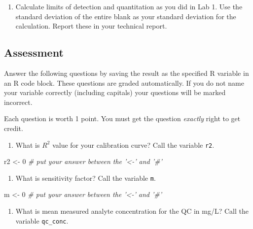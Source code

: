 \documentclass[]{tufte-book}
\newenvironment{Shaded}{}{}
\newcommand{\CommentTok}[1]{\textcolor[rgb]{0.38,0.63,0.69}{\textit{#1}}}
\newcommand{\DecValTok}[1]{\textcolor[rgb]{0.25,0.63,0.44}{#1}}
\newcommand{\NormalTok}[1]{#1}
\newcommand{\StringTok}[1]{\textcolor[rgb]{0.25,0.44,0.63}{#1}}
\providecommand{\tightlist}{%
  \setlength{\itemsep}{0pt}\setlength{\parskip}{0pt}}
\begin{document}
\begin{enumerate}
\def\labelenumi{\arabic{enumi}.}
\tightlist
\item
  Calculate limits of detection and quantitation as you did in Lab 1. Use the standard deviation of the entire blank as your standard deviation for the calculation. Report these in your technical report.
\end{enumerate}

\hypertarget{vape-hplc-assessment}{%
\subsection{Assessment}\label{vape-hplc-assessment}}

Answer the following questions by saving the result as the specified R variable in an R code block. These questions are graded automatically. If you do not name your variable correctly (including capitals) your questions will be marked incorrect.

Each question is worth 1 point. You must get the question \emph{exactly} right to get credit.

\begin{enumerate}
\def\labelenumi{\arabic{enumi}.}
\tightlist
\item
  What is \(R^2\) value for your calibration curve? Call the variable \texttt{r2}.
\end{enumerate}

\begin{Shaded}
\begin{Highlighting}[]
\NormalTok{r2 <-}\StringTok{ }\DecValTok{0}     \CommentTok{# put your answer between the '<-' and '#'}
\end{Highlighting}
\end{Shaded}

\begin{enumerate}
\def\labelenumi{\arabic{enumi}.}
\setcounter{enumi}{1}
\tightlist
\item
  What is sensitivity factor? Call the variable \texttt{m}.
\end{enumerate}

\begin{Shaded}
\begin{Highlighting}[]
\NormalTok{m <-}\StringTok{ }\DecValTok{0}     \CommentTok{# put your answer between the '<-' and '#'}
\end{Highlighting}
\end{Shaded}

\begin{enumerate}
\def\labelenumi{\arabic{enumi}.}
\setcounter{enumi}{2}
\tightlist
\item
  What is mean measured analyte concentration for the QC in mg/L? Call the variable \texttt{qc\_conc}.
\end{enumerate}
\end{document}
